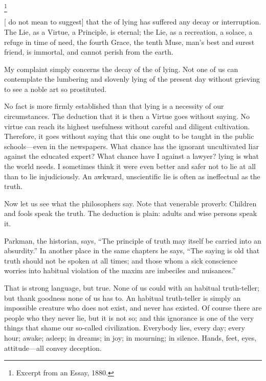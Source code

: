 \documentclass[../interior-demo.tex]{subfiles}
\begin{document}
\begin{upperpage}
\footnote{Excerpt from an Essay, 1880.}
\end{upperpage}
[ do not mean to suggest] that the  of lying has
suffered any decay or interruption. The Lie, as a Virtue, a
Principle, is eternal; the Lie, as a recreation, a solace, a refuge in
time of need, the fourth Grace, the tenth Muse, man's best and surest
friend, is immortal, and cannot perish from the earth.

My complaint simply concerns the decay of the  of lying.
Not one of us can contemplate the lumbering and slovenly lying of the
present day without grieving to see a noble art so prostituted.

No fact is more firmly established than that lying is a necessity of our
circumstances. The deduction that it is then a Virtue goes without
saying. No virtue can reach its highest usefulness without careful and
diligent cultivation. Therefore, it goes without saying that this one
ought to be taught in the public schools---even in the newspapers. What
chance has the ignorant uncultivated liar against the educated expert?
What chance have I against a lawyer?  lying
is what the world needs. I sometimes think it were even better and safer
not to lie at all than to lie injudiciously. An awkward, unscientific
lie is often as ineffectual as the truth.

Now let us see what the philosophers say. Note that venerable proverb:
Children and fools  speak the truth. The deduction is plain:
adults and wise persons  speak it.

 Parkman, the historian,
says, ``The principle of truth may itself be carried into an absurdity.''
In another place in the same chapters he says, ``The saying is old that
truth should not be spoken at all times; and those whom a sick
conscience worries into habitual violation of the maxim are imbeciles
and nuisances.''

That is strong language, but true.
None of us could  with an habitual truth-teller;
but thank goodness none of us has to. An habitual truth-teller is simply
an impossible creature who does not exist, and never has existed.
Of course there are people who  they
never lie, but it is not so; and this ignorance is one of the very
things that shame our so-called civilization. Everybody lies, every day;
every hour; awake; asleep; in dreams; in joy; in mourning; in silence.
Hands, feet, eyes, attitude---all convey deception.
\end{document}
